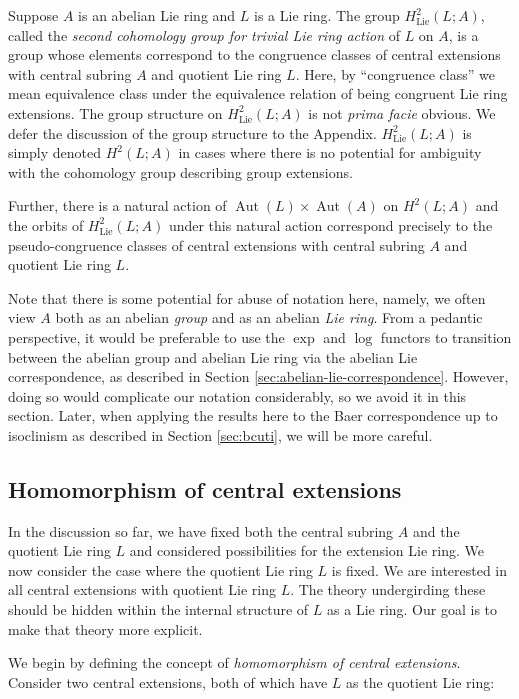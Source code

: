 \documentclass{ucetd}
\begin{document}
Suppose $A$ is an abelian Lie ring and $L$ is a Lie ring. The group
$H^2_{\text{Lie}}(L;A)$, called the {\em second cohomology group for
  trivial Lie ring action} of $L$ on $A$, is a group whose elements
correspond to the congruence classes of central extensions with
central subring $A$ and quotient Lie ring $L$. Here, by ``congruence
class'' we mean equivalence class under the equivalence relation of
being congruent Lie ring extensions. The group structure on
$H^2_{\text{Lie}}(L;A)$ is not {\em prima facie} obvious. We defer the
discussion of the group structure to the
Appendix. $H^2_{\text{Lie}}(L;A)$ is simply denoted $H^2(L;A)$ in
cases where there is no potential for ambiguity with the cohomology
group describing group extensions.

Further, there is a natural action of $\operatorname{Aut}(L) \times
\operatorname{Aut}(A)$ on $H^2(L;A)$ and the orbits of
$H^2_{\text{Lie}}(L;A)$ under this natural action correspond precisely
to the pseudo-congruence classes of central extensions with central
subring $A$ and quotient Lie ring $L$.

Note that there is some potential for abuse of notation here, namely,
we often view $A$ both as an abelian {\em group} and as an abelian
{\em Lie ring}. From a pedantic perspective, it would be preferable to
use the $\exp$ and $\log$ functors to transition between the abelian
group and abelian Lie ring via the abelian Lie correspondence, as
described in Section \ref{sec:abelian-lie-correspondence}. However,
doing so would complicate our notation considerably, so we avoid it in
this section. Later, when applying the results here to the Baer
correspondence up to isoclinism as described in Section
\ref{sec:bcuti}, we will be more careful.

\subsection{Homomorphism of central extensions}\label{sec:homomorphism-central-extensions-lie}

In the discussion so far, we have fixed both the central subring $A$
and the quotient Lie ring $L$ and considered possibilities for the
extension Lie ring. We now consider the case where the quotient Lie
ring $L$ is fixed. We are interested in all central extensions with
quotient Lie ring $L$. The theory undergirding these should be hidden
within the internal structure of $L$ as a Lie ring. Our goal is to
make that theory more explicit.

We begin by defining the concept of {\em homomorphism of central
  extensions}. Consider two central extensions, both of which have $L$
as the quotient Lie ring:
\end{document}
